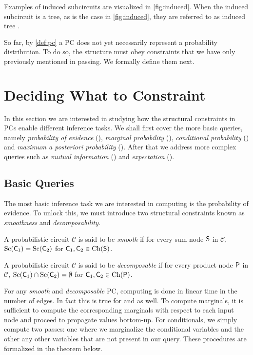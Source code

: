 Examples of induced subcircuits are visualized in \cref{fig:induced}. When the induced subcircuit
is a tree, as is the case in \cref{fig:induced}, they are referred to as induced tree
\citep{zhao15,zhao16b}.

So far, by \cref{def:pc} a PC does not yet necessarily represent a probability distribution. To do
so, the structure must obey constraints that we have only previously mentioned in passing. We
formally define them next.

\section{Deciding What to Constraint}
\label{sec:const}

In this section we are interested in studying how the structural constraints in PCs enable
different inference tasks. We shall first cover the more basic queries, namely \emph{probability of
evidence} (\evi), \emph{marginal probability} (\mar), \emph{conditional probability} (\con) and
\emph{maximum a posteriori probability} (\map). After that we address more complex queries such as
\emph{mutual information} (\mi) and \emph{expectation} (\expc).

\subsection{Basic Queries}

The most basic inference task we are interested in computing is the probability of evidence. To
unlock this, we must introduce two structural constraints known as \emph{smoothness} and
\emph{decomposability}.

\begin{definition}[Smoothness]
  A probabilistic circuit $\mathcal{C}$ is said to be \emph{smooth} if for every sum node $\operatorname{\textsf{S}}$ in
  $\mathcal{C}$, $\operatorname*{\normalfont{Sc}}(\operatorname{\textsf{C}}_1)=\operatorname*{\normalfont{Sc}}(\operatorname{\textsf{C}}_2)$ for $\operatorname{\textsf{C}}_1,\operatorname{\textsf{C}}_2\in\operatorname*{\normalfont{Ch}}(\operatorname{\textsf{S}})$.
\end{definition}

\begin{definition}[Decomposability]
  A probabilistic circuit $\mathcal{C}$ is said to be \emph{decomposable} if for every product node
  $\operatorname{\textsf{P}}$ in $\mathcal{C}$, $\operatorname*{\normalfont{Sc}}(\operatorname{\textsf{C}}_1)\cap\operatorname*{\normalfont{Sc}}(\operatorname{\textsf{C}}_2)=\emptyset$ for $\operatorname{\textsf{C}}_1,\operatorname{\textsf{C}}_2\in
  \operatorname*{\normalfont{Ch}}(\operatorname{\textsf{P}})$.
\end{definition}

For any \emph{smooth} and \emph{decomposable} PC, computing \evi{} is done in linear time in the
number of edges. In fact this is true for \mar{} and \con{} as well. To compute marginals, it is
sufficient to compute the corresponding marginals with respect to each input node and proceed to
propagate values bottom-up. For conditionals, we simply compute two passes: one where we
marginalize the conditional variables and the other any other variables that are not present in our
query. These procedures are formalized in the theorem below.

